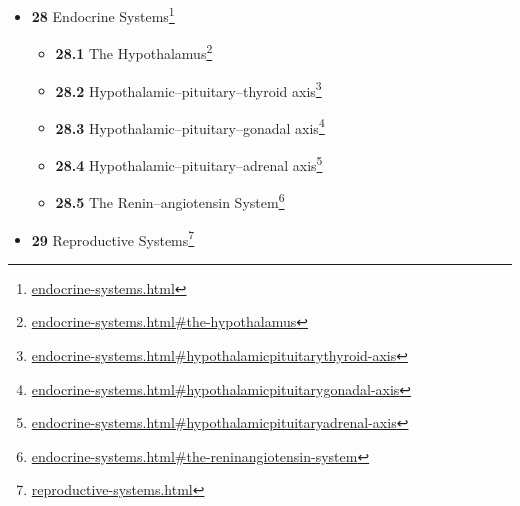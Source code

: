 \documentclass[
]{article}
\providecommand{\tightlist}{%
  \setlength{\itemsep}{0pt}\setlength{\parskip}{0pt}}
\providecommand{\tightlist}{%
  \setlength{\itemsep}{0pt}\setlength{\parskip}{0pt}}
\let\rmarkdownfootnote\footnote%
\def\footnote{\protect\rmarkdownfootnote}
\renewcommand{\href}[2]{#2\footnote{\url{#1}}}
\theoremstyle{definition}
\theoremstyle{definition}
\theoremstyle{definition}
\theoremstyle{remark}
\begin{document}
\begin{itemize}
\begin{itemize}
    \begin{itemize}
    \tightlist
    \item
      \href{animal-locomotion-and-support-systems.html\#muscle-contraction}{\emph{}\textbf{27.3.1}
      Muscle Contraction}
    \item
      \href{animal-locomotion-and-support-systems.html\#skeletal-muscle}{\emph{}\textbf{27.3.2}
      Skeletal Muscle}
    \item
      \href{animal-locomotion-and-support-systems.html\#excitation-contraction-coupling}{\emph{}\textbf{27.3.3}
      Excitation-contraction Coupling}
    \item
      \href{animal-locomotion-and-support-systems.html\#the-sliding-filament-theory}{\emph{}\textbf{27.3.4}
      The Sliding Filament Theory}
    \item
      \href{animal-locomotion-and-support-systems.html\#crossbridge-cycling}{\emph{}\textbf{27.3.5}
      Crossbridge Cycling}
    \item
      \href{animal-locomotion-and-support-systems.html\#smooth-muscle}{\emph{}\textbf{27.3.6}
      Smooth Muscle}
    \item
      \href{animal-locomotion-and-support-systems.html\#cardiac-muscle}{\emph{}\textbf{27.3.7}
      Cardiac Muscle}
    \item
      \href{animal-locomotion-and-support-systems.html\#the-muscular-systems-of-invertebrates}{\emph{}\textbf{27.3.8}
      The Muscular Systems of Invertebrates}
    \end{itemize}
  \end{itemize}
\item
  \href{endocrine-systems.html}{\emph{}\textbf{28} Endocrine Systems}

  \begin{itemize}
  \tightlist
  \item
    \href{endocrine-systems.html\#the-hypothalamus}{\emph{}\textbf{28.1}
    The Hypothalamus}
  \item
    \href{endocrine-systems.html\#hypothalamicpituitarythyroid-axis}{\emph{}\textbf{28.2}
    Hypothalamic--pituitary--thyroid axis}
  \item
    \href{endocrine-systems.html\#hypothalamicpituitarygonadal-axis}{\emph{}\textbf{28.3}
    Hypothalamic--pituitary--gonadal axis}
  \item
    \href{endocrine-systems.html\#hypothalamicpituitaryadrenal-axis}{\emph{}\textbf{28.4}
    Hypothalamic--pituitary--adrenal axis}
  \item
    \href{endocrine-systems.html\#the-reninangiotensin-system}{\emph{}\textbf{28.5}
    The Renin--angiotensin System}
  \end{itemize}
\item
  \href{reproductive-systems.html}{\emph{}\textbf{29} Reproductive
  Systems}


\end{itemize}
\end{document}
